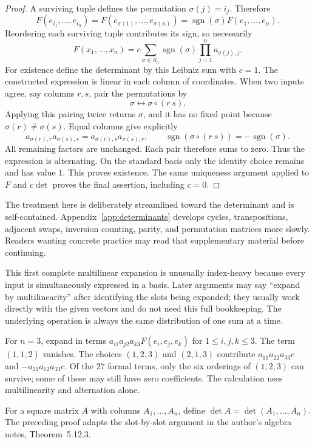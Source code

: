 \begin{proof}
A surviving tuple defines the permutation $\sigma(j)=i_j$. Therefore
\[
F(e_{i_1},\ldots,e_{i_n})
=F(e_{\sigma(1)},\ldots,e_{\sigma(n)})
=\operatorname{sgn}(\sigma)F(e_1,\ldots,e_n).
\]
Reordering each surviving tuple contributes its sign, so necessarily
\[
F(x_1,\ldots,x_n)=c\sum_{\sigma\in S_n}\operatorname{sgn}(\sigma)
\prod_{j=1}^n a_{\sigma(j),j}.
\]
For existence define the determinant by this Leibniz sum with $c=1$.
The constructed
expression is linear in each column of coordinates. When two inputs agree,
say columns $r,s$, pair the permutations by
\[
\sigma\longleftrightarrow\sigma\circ(r\ s).
\]
Applying this pairing twice returns $\sigma$, and it has no fixed point
because $\sigma(r)\ne\sigma(s)$. Equal columns give explicitly
\[
a_{\sigma(r),r}a_{\sigma(s),s}
=a_{\sigma(r),s}a_{\sigma(s),r},\qquad
\operatorname{sgn}(\sigma\circ(r\ s))=-\operatorname{sgn}(\sigma).
\]
All remaining factors are unchanged. Each pair therefore sums to zero. Thus the expression is alternating. On the standard
basis only the identity choice remains and has value $1$.
This proves existence. The same uniqueness argument applied to $F$ and
$c\det$ proves the final assertion, including $c=0$.
\end{proof}
\begin{remark}
The treatment here is deliberately streamlined toward the determinant and
is self-contained. Appendix~\ref{app:determinants} develops cycles,
transpositions, adjacent swaps, inversion counting, parity, and permutation
matrices more slowly. Readers wanting concrete practice may read that
supplementary material before continuing.
\end{remark}

\begin{remark}
This first complete multilinear expansion is unusually index-heavy because
every input is simultaneously expressed in a basis. Later arguments may
say ``expand by multilinearity'' after identifying the slots being expanded;
they usually work directly with the given vectors and do not need this full
bookkeeping. The underlying operation is always the same distribution of
one sum at a time.
\end{remark}
\begin{example}
For $n=3$, expand in terms
$a_{i1}a_{j2}a_{k3}F(e_i,e_j,e_k)$ for $1\leq i,j,k\leq3$.
The term $(1,1,2)$ vanishes. The choices $(1,2,3)$ and $(2,1,3)$
contribute $a_{11}a_{22}a_{33}c$ and $-a_{21}a_{12}a_{33}c$.
Of the $27$ formal terms, only the six orderings of $(1,2,3)$ can survive;
some of these may still have zero coefficients. The calculation uses
multilinearity and alternation alone.
\end{example}
For a square matrix $A$ with columns $A_1,\ldots,A_n$, define
$\det A=\det(A_1,\ldots,A_n)$. The preceding proof adapts the
slot-by-slot argument in the author's algebra notes, Theorem~5.12.3.

